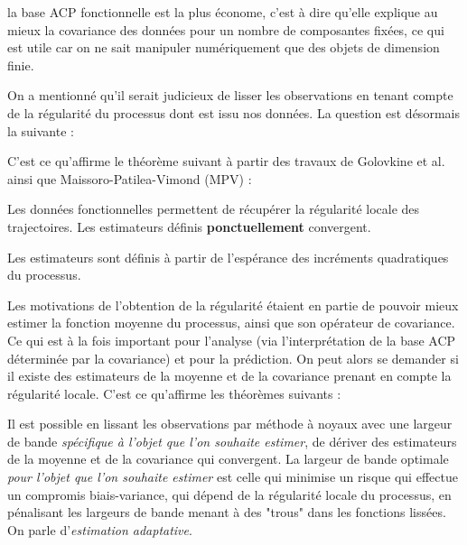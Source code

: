 \begin{propriete*}
    la base ACP fonctionnelle est la plus économe, c'est à dire qu'elle explique au mieux la covariance des données pour un nombre de composantes fixées, ce qui est utile car on ne sait manipuler numériquement que des objets de dimension finie.
\end{propriete*}

On a mentionné qu'il serait judicieux de lisser les observations en tenant compte de la régularité du processus dont est issu nos données. La question est désormais la suivante :


C'est ce qu'affirme le théorème suivant à partir des travaux de Golovkine et al. ainsi que Maissoro-Patilea-Vimond (MPV) :

\begin{thm*}
    Les données fonctionnelles permettent de récupérer la régularité locale des trajectoires. Les estimateurs définis \textbf{ponctuellement} convergent. 
\end{thm*}
\begin{rem}
    Les estimateurs sont définis à partir de l'espérance des incréments quadratiques du processus.
\end{rem}

Les motivations de l'obtention de la régularité étaient en partie de pouvoir mieux estimer la fonction moyenne du processus, ainsi que son opérateur de covariance. Ce qui est à la fois important pour l'analyse (via l'interprétation de la base ACP déterminée par la covariance) et pour la prédiction. On peut alors se demander si il existe des estimateurs de la moyenne et de la covariance prenant en compte la régularité locale. C'est ce qu'affirme les théorèmes suivants :


\begin{thm*}
    Il est possible en lissant les observations par méthode à noyaux avec une largeur de bande \emph{spécifique à l'objet que l'on souhaite estimer}, de dériver des estimateurs de la moyenne et de la covariance qui convergent. 
    La largeur de bande optimale \emph{pour l'objet que l'on souhaite estimer} est celle qui minimise un risque qui effectue un compromis biais-variance, qui dépend de la régularité locale du processus, en pénalisant les largeurs de bande menant à des "trous" dans les fonctions lissées.
    On parle d'\emph{estimation adaptative}.
\end{thm*}

